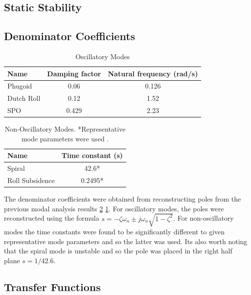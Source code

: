 \documentclass{article}
\begin{document}
\subsection{Static Stability}




\subsection{Denominator Coefficients}

\begin{table}[H]
    \centering
    \begin{tabular}{lcc}
        \toprule
        Name & Damping factor & Natural frequency (rad/s) \\
        \midrule
        Phugoid & 0.06 & 0.126 \\
        Dutch Roll & 0.12 & 1.52 \\
        SPO & 0.429 & 2.23 \\
        \bottomrule
    \end{tabular}
    \caption{Oscillatory Modes}
      \label{tab:oscillatory_modes}
  \end{table}
  
  \begin{table}[H]
    \centering
    \begin{tabular}{lc}
        \toprule
        Name & Time constant (s) \\
        \midrule
        Spiral & 42.6* \\
        Roll Subsidence & 0.2495* \\
        \bottomrule
    \end{tabular}
    \caption{Non-Oscillatory Modes. *Representative mode parameters were used \cite{rep}.}
    \label{tab:non_oscillatory_modes}
  \end{table}

The denominator coefficients were obtained from reconstructing poles from the previous modal analysis results \ref{tab:non_oscillatory_modes} \ref{tab:oscillatory_modes}.
For oscillatory modes, the poles were reconstructed using the formula $s = -\zeta\omega_n \pm j\omega_n\sqrt{1-\zeta^2}$.
For non-oscillatory modes the time constants were found to be significantly different to given representative mode parameters \cite{rep} and so the latter was used.
Its also worth noting that the spiral mode is unstable and so the pole was placed in the right half plane $s = 1/42.6$.


\subsection{Transfer Functions}
\end{document}
